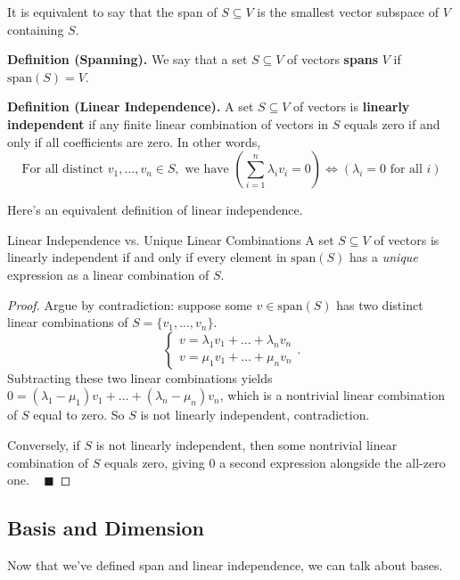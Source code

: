 \begin{remark}
    It is equivalent to say that the span of $S \subseteq V$ is the smallest vector subspace of $V$ containing $S$.
\end{remark}

\textbf{Definition (Spanning).} We say that a set $S \subseteq V$ of vectors \textbf{spans} $V$ if $\mathrm{span}(S) = V$.

\textbf{Definition (Linear Independence).} A set $S \subseteq V$ of vectors is \textbf{linearly independent} if any finite linear combination of vectors in $S$ equals zero if and only if all coefficients are zero.  In other words,
\[ \text{For all distinct } v_1, \dots, v_n \in S, \text{ we have } \left ( \sum_{i = 1}^n \lambda_i v_i = 0 \right) \iff \left( \lambda_i = 0 \text{ for all } i \right)  \]

Here's an equivalent definition of linear independence.

\begin{theorem}{Linear Independence vs. Unique Linear Combinations}
    A set $S \subseteq V$ of vectors is linearly independent if and only if every element in $\mathrm{span}(S)$ has a \emph{unique} expression as a linear combination of $S$.
\end{theorem}

\begin{proof}
    Argue by contradiction: suppose some $v \in \mathrm{span}(S)$ has two distinct linear combinations of $S = \{v_1, \dots, v_n\}$.
    \[ \begin{cases} v = \lambda_1v_1 + \dots + \lambda_n v_n \\
    v = \mu_1 v_1 + \dots + \mu_n v_n \end{cases}. \]
    Subtracting these two linear combinations yields $0 = (\lambda_1 - \mu_1)v_1 + \dots + (\lambda_n - \mu_n)v_n$, which is a nontrivial linear combination of $S$ equal to zero.  So $S$ is not linearly independent, contradiction.
    
    Conversely, if $S$ is not linearly independent, then some nontrivial linear combination of $S$ equals zero, giving $0$ a second expression alongside the all-zero one. ~ $\blacksquare$
\end{proof}

\subsection{Basis and Dimension}

Now that we've defined span and linear independence, we can talk about bases.


